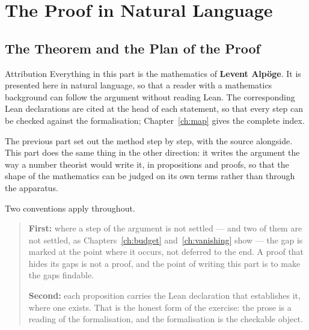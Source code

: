 \part{The Proof in Natural Language}
\label{part:proof}

\chapter{The Theorem and the Plan of the Proof}
\label{ch:plan}

\begin{seamnote}{Attribution}
Everything in this part is the mathematics of \textbf{Levent Alpöge}. It is
presented here in natural language, so that a reader with a mathematics
background can follow the argument without reading Lean. The corresponding
Lean declarations are cited at the head of each statement, so that every step
can be checked against the formalisation; Chapter~\ref{ch:map} gives the
complete index.
\end{seamnote}

The previous part set out the method step by step, with the source alongside.
This part does the same thing in the other direction: it writes the argument
the way a number theorist would write it, in propositions and proofs, so that
the shape of the mathematics can be judged on its own terms rather than
through the apparatus.

Two conventions apply throughout.

\begin{quote}
\textbf{First:} where a step of the argument is not settled --- and two of
them are not settled, as Chapters~\ref{ch:budget} and~\ref{ch:vanishing} show
--- the gap is marked at the point where it occurs, not deferred to the
end. A proof that hides its gaps is not a proof, and the point of writing
this part is to make the gaps findable.

\textbf{Second:} each proposition carries the Lean declaration that
establishes it, where one exists. That is the honest form of the exercise:
the prose is a reading of the formalisation, and the formalisation is the
checkable object.
\end{quote}

